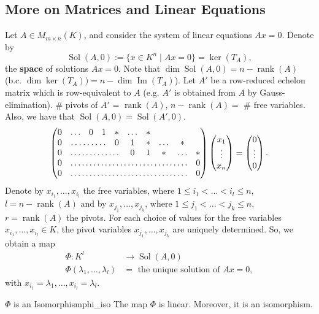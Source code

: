 \subsection{More on Matrices and Linear Equations}
Let $A \in M_{m \times n}(K)$, and consider the system of linear equations $A x = 0$. Denote by
\[
	\operatorname{Sol}(A,0) := \{x \in K^n \;|\; Ax = 0\} = \ker(T_A),
\]
the \textbf{space} of solutions $Ax = 0$. Note that $\dim \operatorname{Sol}(A,0) = n - \operatorname{rank}(A)$ (b.c. $\dim \ker(T_A)) = n - \dim \operatorname{Im}(T_A)$). Let $A'$ be a row-reduced echelon matrix which is row-equivalent to $A$ (e.g. $A'$ is obtained from $A$ by Gauss-elimination). \# pivots of $A'$ = $\operatorname{rank}(A)$, $n - \operatorname{rank}(A) =$ \# free variables. Also, we have that $\operatorname{Sol}(A,0) = \operatorname{Sol}(A', 0)$.
\[
	\begin{pmatrix}
		0 & \hdots & 0 & 1 & \ast & \hdots & \ast \\
		0 & \hdotsfor{3} & 0 & 1 & \ast & \hdots & \ast \\
		0 & \hdotsfor{4} & 0 & 1 & \ast & \hdots & \ast \\
		0 & \hdotsfor{8} & 0\\
		0 & \hdotsfor{8} & 0 
	\end{pmatrix}
	\begin{pmatrix}
		x_1\\
		\vdots \\
		x_n
	\end{pmatrix}
	=
	\begin{pmatrix}
		0\\
		\vdots \\
		0
	\end{pmatrix}.
\]
Denote by $x_{i_1}, \hdots , x_{i_l}$ the free variables, where $1 \leq i_1 < \hdots < i_l \leq n$, $l = n - \operatorname{rank}(A)$ and by $x_{j_1}, \hdots , x_{j_k}$, where $1 \leq j_1 < \hdots < j_k \leq n$, $r = \operatorname{rank}(A)$ the pivots. For each choice of values for the free variables $x_{i_1}, \hdots , x_{i_l} \in K$, the pivot variables $x_{j_1}, \hdots , x_{j_k}$ are uniquely determined. So, we obtain a map
\begin{align*}
	\Phi: K^l &\to \operatorname{Sol}(A,0)\\
	\Phi(\lambda_1 ,\hdots , \lambda_l) &= \text{ the unique solution of } Ax = 0,
\end{align*}
with $x_{i_1} = \lambda_1, \hdots , x_{i_l} = \lambda_l$.

\begin{proposition}{$\Phi$ is an Isomorphism}{phi_iso}
	The map $\Phi$ is linear. Moreover, it is an isomorphism.
\end{proposition}

